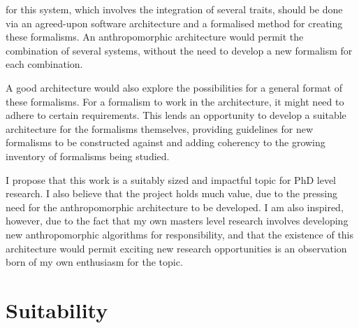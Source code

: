  for this system, which involves the integration of several traits, should be done via an agreed-upon software architecture and a formalised method for creating these formalisms. An anthropomorphic architecture would permit the combination of several systems, without the need to develop a new formalism for each combination.\par

A good architecture would also explore the possibilities for a general format of these formalisms. For a formalism to work in the architecture, it might need to adhere to certain requirements. This lends an opportunity to develop a suitable architecture for the formalisms themselves, providing guidelines for new formalisms to be constructed against and adding coherency to the growing inventory of formalisms being studied.\par

I propose that this work is a suitably sized and impactful topic for PhD level research. I also believe that the project holds much value, due to the pressing need for the anthropomorphic architecture to be developed. I am also inspired, however, due to the fact that my own masters level research involves developing new anthropomorphic algorithms for responsibility, and that the existence of this architecture would permit exciting new research opportunities is an observation born of my own enthusiasm for the topic. \par

\section{Suitability}





